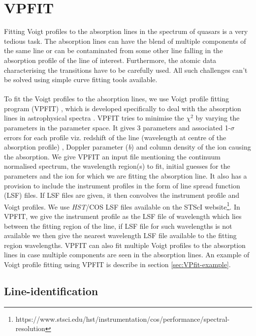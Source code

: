 \section{VPFIT}

Fitting Voigt profiles to the absorption lines in the spectrum of quasars is a very tedious task. The absorption lines can have the blend of multiple components of the same line or can be contaminated from some other line falling in the absorption profile of the line of interest. Furthermore, the atomic data characterising the transitions have to be carefully used.  All such challenges can't be solved using simple curve fitting tools available. 
\\\\
To fit the Voigt profiles to the absorption lines, we use Voigt profile fitting program (VPFIT) \citep{vpfit}, which is developed specifically to deal with the absorption lines in astrophysical spectra . VPFIT tries to minimise the $\chi^2$ by varying the parameters in the parameter space. It gives 3 parameters and associated 1-$\sigma$ errors for each profile viz. redshift of the line (wavelength at centre of the absorption profile) , Doppler parameter (\emph{b}) and column density of the ion causing the absorption. We give VPFIT an input file mentioning the continuum normalised spectrum, the wavelength region(s) to fit, initial guesses for the parameters and the ion for which we are fitting the absorption line. It also has a provision to include the instrument profiles in the form of line spread function (LSF) files. If LSF files are given, it then convolves the instrument profile and Voigt profiles. We use \textit{HST}/COS LSF files available on the STScI website\footnote{https://www.stsci.edu/hst/instrumentation/cos/performance/spectral-resolution}. In VPFIT, we give the instrument profile as the LSF file of wavelength which lies between the fitting region of the line, if LSF file for such wavelengths is not available we then give the nearest wavelength LSF file available to the fitting region wavelengths. VPFIT can also fit multiple Voigt profiles to the absorption lines in case multiple components are seen in the absorption lines. An example of Voigt profile fitting using VPFIT is describe in section \ref{sec:VPfit-example}.

\subsection{Line-identification}

